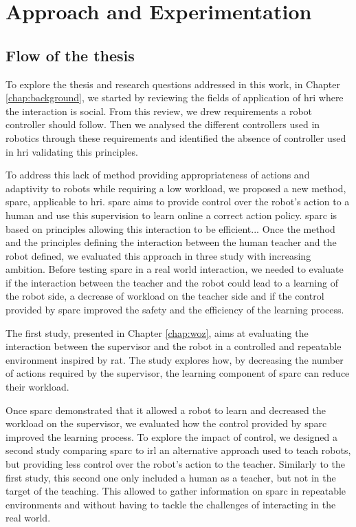 \section{Approach and Experimentation}\label{sec:intro-exps}

\subsection{Flow of the thesis}%

To explore the thesis and research questions addressed in this work, in Chapter \ref{chap:background}, we started by reviewing the fields of application of \gls{hri} where the interaction is social. From this review, we drew requirements a robot controller should follow. Then we analysed the different controllers used in robotics through these requirements and identified the absence of controller used in \gls{hri} validating this principles.

To address this lack of method providing appropriateness of actions and adaptivity to robots while requiring a low workload, we proposed a new method, \gls{sparc}, applicable to \gls{hri}. \gls{sparc} aims to provide control over the robot's action to a human and use this supervision to learn online a correct action policy. \gls{sparc} is based on principles allowing this interaction to be efficient... Once the method and the principles defining the interaction between the human teacher and the robot defined, we evaluated this approach in three study with increasing ambition. Before testing \gls{sparc} in a real world interaction, we needed to evaluate if the interaction between the teacher and the robot could lead to a learning of the robot side, a decrease of workload on the teacher side and if the control provided by \gls{sparc} improved the safety and the efficiency of the learning process.

The first study, presented in Chapter \ref{chap:woz}, aims at evaluating the interaction between the supervisor and the robot in a controlled and repeatable environment inspired by \gls{rat}. The study explores how, by decreasing the number of actions required by the supervisor, the learning component of \gls{sparc} can reduce their workload.

Once \gls{sparc} demonstrated that it allowed a robot to learn and decreased the workload on the supervisor, we evaluated how the control provided by \gls{sparc} improved the learning process. To explore the impact of control, we designed a second study comparing \gls{sparc} to \gls{irl} an alternative approach used to teach robots, but providing less control over the robot's action to the teacher. Similarly to the first study, this second one only included a human as a teacher, but not in the target of the teaching. This allowed to gather information on \gls{sparc} in repeatable environments and without having to tackle the challenges of interacting in the real world.


